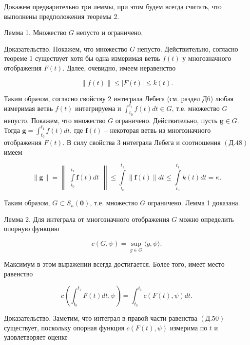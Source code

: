 \documentclass[8pt]{extarticle}
\begin{document}
Докажем предварительно три леммы, при этом будем всегда считать, что выполнены предположения теоремы 2.

Лемма 1. Множество \(G\) непусто и ограничено.

Доказательство. Покажем, что множество \(G\) непусто. Действительно, согласно теореме 1 существует хотя бы одна измеримая ветвь \(f\left( t\right)\) у многозначного отображения \(F\left( t\right)\). Далее, очевидно, имеем неравенство

\[
\parallel f\left( t\right) \parallel \leq \left| {F\left( t\right)}\right| \leq k\left( t\right). \tag{Д.48}
\]

Таким образом, согласно свойству 2 интеграла Лебега (см. раздел Д6) любая измеримая ветвь \(f\left( t\right)\) интегрируема и \({\int }_{{t}_{0}}^{{t}_{1}}f\left( t\right) {dt} \in G\), т.е. множество \(G\) непусто. Покажем, что множество \(G\) ограничено. Действительно, пусть \(\mathbf{g} \in G\). Тогда \(\mathbf{g} = {\int }_{{t}_{0}}^{{t}_{1}}f\left( t\right) {dt}\), где \(\mathbf{f}\left( t\right)\) -- некоторая ветвь из многозначного отображения \(F\left( t\right)\). В силу свойства 3 интеграла Лебега и соотношения \((Д.48)\) имеем

\[
\parallel \mathbf{g}\parallel =
\left\lVert \begin{array}{c} {\mathop{\int }\limits_{{t}_{0}}^{{t}_{1}}\mathbf{f}\left( t\right) {dt}} \end{array} \right\rVert
\leq \mathop{\int }\limits_{{t}_{0}}^{{t}_{1}}\parallel \mathbf{f}\left( t\right) \parallel {dt}
\leq \mathop{\int }\limits_{{t}_{0}}^{{t}_{1}}k\left( t\right) {dt} = \kappa .
\]

Таким образом, \(G \subset {S}_{\kappa}\left( \mathbf{0}\right)\), т.е. множество \(G\) ограничено. Лемма 1 доказана.

Лемма 2. Для интеграла от многозначного отображения \(G\) можно определить опорную функцию

\[
c\left( {G,\psi}\right) = \mathop{\sup }\limits_{{g \in G}}\langle g,\psi\rangle . \tag{Д.49}
\]

Максимум в этом выражении всегда достигается. Более того, имеет место равенство

\[
c\left( {{\int }_{{t}_{0}}^{{t}_{1}}F\left( t\right) {dt},\psi}\right)
= {\int }_{{t}_{0}}^{{t}_{1}}c\left( {F\left( t\right),\psi}\right) {dt}. \tag{Д.50}
\]

Доказательство. Заметим, что интеграл в правой части равенства \((Д.50)\) существует, поскольку опорная функция \(c\left( {F\left( t\right),\psi}\right)\) измерима по \(t\) и удовлетворяет оценке
\end{document}
